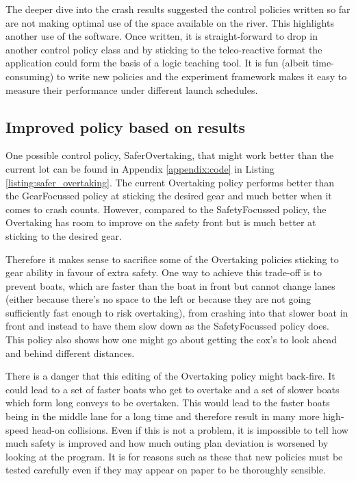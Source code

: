   The deeper dive into the crash results suggested the control policies written so far are not making optimal use of the space available on the river. This highlights another use of the software. Once written, it is straight-forward to drop in another control policy class and by sticking to the teleo-reactive format the application could form the basis of a logic teaching tool. It is fun (albeit time-consuming) to write new policies and the experiment framework makes it easy to measure their performance under different launch schedules.
  
  \subsection{Improved policy based on results}
  One possible control policy, SaferOvertaking, that might work better than the current lot can be found in Appendix \ref{appendix:code} in Listing \ref{listing:safer_overtaking}. The current Overtaking policy performs better than the GearFocussed policy at sticking the desired gear and much better when it comes to crash counts. However, compared to the SafetyFocussed policy, the Overtaking has room to improve on the safety front but is much better at sticking to the desired gear. 
  
  Therefore it makes sense to sacrifice some of the Overtaking policies sticking to gear ability in favour of extra safety. One way to achieve this trade-off is to prevent boats, which are faster than the boat in front but cannot change lanes (either because there's no space to the left or because they are not going sufficiently fast enough to risk overtaking), from crashing into that slower boat in front and instead to have them slow down as the SafetyFocussed policy does. This policy also shows how one might go about getting the cox's to look ahead and behind different distances. 
  
  There is a danger that this editing of the Overtaking policy might back-fire. It could lead to a set of faster boats who get to overtake and a set of slower boats which form long conveys to be overtaken. This would lead to the faster boats being in the middle lane for a long time and therefore result in many more high-speed head-on collisions. Even if this is not a problem, it is impossible to tell how much safety is improved and how much outing plan deviation is worsened by looking at the program. It is for reasons such as these that new policies must be tested carefully even if they may appear on paper to be thoroughly sensible.
  
